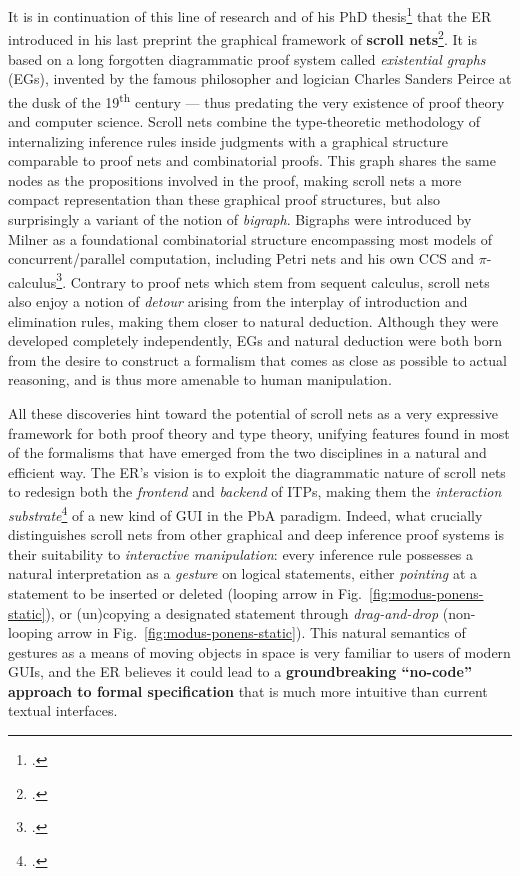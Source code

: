 \documentclass[11pt]{msca-pf}
\begin{document}
It is in continuation of this line of research and of his PhD
thesis\footcite{donatoDeepInferenceGraphical2024} that the ER introduced in his last preprint the
graphical framework of \textbf{scroll nets}\footcite{donatoScrollNets2025}. It is based on a long
forgotten diagrammatic proof system called \emph{existential graphs} (EGs), invented by the famous
philosopher and logician Charles Sanders Peirce at the dusk of the 19\textsuperscript{th} century
--- thus predating the very existence of proof theory and computer science. Scroll nets combine the
type-theoretic methodology of internalizing inference rules inside judgments with a graphical
structure comparable to proof nets and combinatorial proofs. This graph shares the same nodes as the
propositions involved in the proof, making scroll nets a more compact representation than these
graphical proof structures, but also surprisingly a variant of the notion of \emph{bigraph}.
Bigraphs were introduced by Milner as a foundational combinatorial structure encompassing most
models of concurrent/parallel computation, including Petri nets and his own CCS and
$\pi$-calculus\footcite{milnerBigraphicalReactiveSystems2001}. Contrary to proof nets which stem
from sequent calculus, scroll nets also enjoy a notion of \emph{detour} arising from the interplay
of introduction and elimination rules, making them closer to natural deduction. Although they were
developed completely independently, EGs and natural deduction were both born from the desire to
construct a formalism that comes as close as possible to actual reasoning, and is thus more amenable
to human manipulation.

All these discoveries hint toward the potential of scroll nets as a very expressive framework for
both proof theory and type theory, unifying features found in most of the formalisms that have
emerged from the two disciplines in a natural and efficient way. The ER's vision is to exploit the
diagrammatic nature of scroll nets to redesign both the \emph{frontend} and \emph{backend} of ITPs,
making them the \emph{interaction substrate}\footcite{mackayInteractionSubstratesCombining2025} of a
new kind of GUI in the PbA paradigm. Indeed, what crucially distinguishes scroll nets from other
graphical and deep inference proof systems is their suitability to \emph{interactive manipulation}:
every inference rule possesses a natural interpretation as a \emph{gesture} on logical statements,
either \emph{pointing} at a statement to be inserted or deleted (looping arrow in
Fig.~\ref{fig:modus-ponens-static}), or (un)copying a designated statement through
\emph{drag-and-drop} (non-looping arrow in Fig.~\ref{fig:modus-ponens-static}). This natural
semantics of gestures as a means of moving objects in space is very familiar to users of modern
GUIs, and the ER believes it could lead to a \textbf{groundbreaking ``no-code'' approach to formal
specification} that is much more intuitive than current textual interfaces.
 
\end{document}
